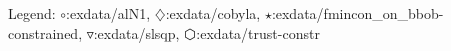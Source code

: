 Legend: {\color{NavyBlue}$\circ$}:exdata/alN1, {\color{Magenta}$\diamondsuit$}:exdata/cobyla, {\color{Orange}$\star$}:exdata/fmincon\_on\_bbob-constrained, {\color{CornflowerBlue}$\triangledown$}:exdata/slsqp, {\color{red}$\varhexagon$}:exdata/trust-constr